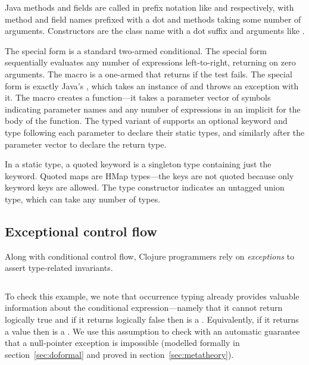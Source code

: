Java methods and fields are called in prefix notation
like  and  respectively,
with method and field names prefixed with a dot and methods taking some number of arguments.
Constructors are the class name with a dot suffix and arguments like .

The  special form is a standard two-armed conditional.
The  special form sequentially evaluates any number of expressions
left-to-right, returning \nil{} on zero arguments.
The  macro is a one-armed  that returns  if the test fails.
The  special form is exactly Java's , which takes an
instance of  and throws an exception with it.
The  macro creates a function---it takes a parameter vector of symbols indicating parameter names
and any number of expressions in an implicit  for the body of the function.
The typed
variant of  supports an optional keyword \clj{:-} and type following
each parameter to declare their static types, and similarly after
the parameter vector to declare the return type.

In a static type, a quoted keyword  is a singleton type containing just the keyword.
Quoted maps  are HMap types---the keys are not quoted because only keyword keys
are allowed. The type constructor  indicates an untagged union type, which can take
any number of types.

\subsection{Exceptional control flow}

Along with conditional control flow,
Clojure programmers rely on \emph{exceptions}
to assert type-related invariants.

\begin{exmp}
\inputminted[firstline=13,lastline=15]{clojure}{code/demo/src/demo/do.clj}
\label{example:doexception}
\end{exmp}

To check this example, we note that
occurrence typing already provides
valuable information about the conditional expression---namely that it cannot return logically true and if it returns logically false 
then  is a . Equivalently, if it returns a value then  is a .
We use this assumption to check  with an automatic
guarantee that a null-pointer exception is impossible
(modelled formally in section~\ref{sec:doformal} and proved
in section~\ref{sec:metatheory}).

